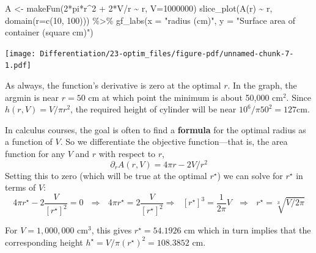 \documentclass[
  letterpaper,
  DIV=11,
  numbers=noendperiod,
  oneside]{scrreprt}
\newenvironment{Shaded}{\begin{snugshade}}{\end{snugshade}}
\newcommand{\AttributeTok}[1]{\textcolor[rgb]{0.40,0.46,0.14}{#1}}
\newcommand{\DecValTok}[1]{\textcolor[rgb]{0.68,0.00,0.00}{#1}}
\newcommand{\FunctionTok}[1]{\textcolor[rgb]{0.28,0.35,0.67}{#1}}
\newcommand{\NormalTok}[1]{\textcolor[rgb]{0.00,0.46,0.62}{#1}}
\newcommand{\OtherTok}[1]{\textcolor[rgb]{0.00,0.46,0.62}{#1}}
\newcommand{\SpecialCharTok}[1]{\textcolor[rgb]{0.37,0.37,0.37}{#1}}
\newcommand{\StringTok}[1]{\textcolor[rgb]{0.13,0.47,0.30}{#1}}
\begin{document}
\begin{Shaded}
\begin{Highlighting}[]
\NormalTok{A }\OtherTok{\textless{}{-}} \FunctionTok{makeFun}\NormalTok{(}\DecValTok{2}\SpecialCharTok{*}\NormalTok{pi}\SpecialCharTok{*}\NormalTok{r}\SpecialCharTok{\^{}}\DecValTok{2} \SpecialCharTok{+} \DecValTok{2}\SpecialCharTok{*}\NormalTok{V}\SpecialCharTok{/}\NormalTok{r }\SpecialCharTok{\textasciitilde{}}\NormalTok{ r, }\AttributeTok{V=}\DecValTok{1000000}\NormalTok{)}
\FunctionTok{slice\_plot}\NormalTok{(}\FunctionTok{A}\NormalTok{(r) }\SpecialCharTok{\textasciitilde{}}\NormalTok{ r, }\FunctionTok{domain}\NormalTok{(}\AttributeTok{r=}\FunctionTok{c}\NormalTok{(}\DecValTok{10}\NormalTok{, }\DecValTok{100}\NormalTok{))) }\SpecialCharTok{\%\textgreater{}\%}
  \FunctionTok{gf\_labs}\NormalTok{(}\AttributeTok{x =} \StringTok{"radius (cm)"}\NormalTok{, }\AttributeTok{y =} \StringTok{"Surface area of container (square cm)"}\NormalTok{)}
\end{Highlighting}
\end{Shaded}

\begin{marginfigure}

{\centering \texttt{[image: Differentiation/23-optim\_files/figure-pdf/unnamed-chunk-7-1.pdf]}

}

\end{marginfigure}

As always, the function's derivative is zero at the optimal \(r\). In
the graph, the argmin is near \(r=50\) cm at which point the minimum is
about 50,000 cm\(^2\). Since \(h(r,V) = V/\pi r^2\), the required height
of cylinder will be near \(10^6 / \pi 50^2 = 127\)cm.

In calculus courses, the goal is often to find a \textbf{formula} for
the optimal radius as a function of \(V\). So we differentiate the
objective function---that is, the area function for any \(V\) and \(r\)
with respect to \(r\), \[\partial_r A(r, V) = 4 \pi r - 2 V / r^2\]
Setting this to zero (which will be true at the optimal \(r^\star\)) we
can solve for \(r^\star\) in terms of \(V\):
\[4 \pi r^\star - 2 \frac{V}{\left[r^\star\right]^2} = 0 \ \ \ \Longrightarrow\ \ \ 4\pi r^\star = 2\frac{V}{\left[r^\star\right]^2} \Longrightarrow\ \ \ \left[r^\star\right]^3 = \frac{1}{2\pi} V \ \ \ \Longrightarrow\ \ \  r^\star = \sqrt[3]{V/2\pi}\]

For \(V = 1,000,000\) cm\(^3\), this gives \(r^\star = 54.1926\) cm
which in turn implies that the corresponding height
\(h^\star = V/\pi (r^\star)^2 = 108.3852\) cm.
\end{document}
